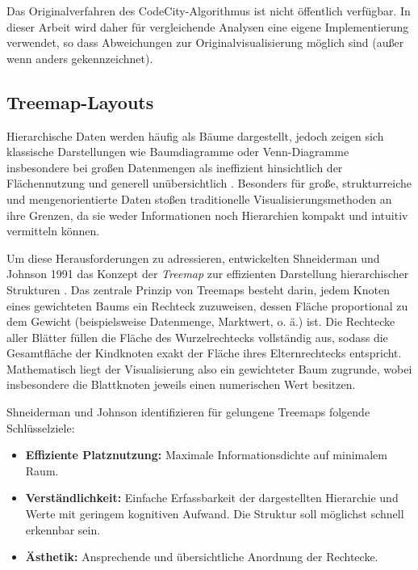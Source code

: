 Das Originalverfahren des CodeCity-Algorithmus ist nicht öffentlich verfügbar. In dieser Arbeit wird daher für vergleichende Analysen eine eigene Implementierung verwendet, so dass Abweichungen zur Originalvisualisierung möglich sind (außer wenn anders gekennzeichnet).

\subsection{Treemap-Layouts} \label{sec:Treemap}

Hierarchische Daten werden häufig als Bäume dargestellt, jedoch zeigen sich klassische Darstellungen wie Baumdiagramme oder Venn-Diagramme insbesondere bei großen Datenmengen als ineffizient hinsichtlich der Flächennutzung und generell unübersichtlich \cite{johnson1991tree}. Besonders für große, strukturreiche und mengenorientierte Daten stoßen traditionelle Visualisierungsmethoden an ihre Grenzen, da sie weder Informationen noch Hierarchien kompakt und intuitiv vermitteln können.

Um diese Herausforderungen zu adressieren, entwickelten Shneiderman und Johnson 1991 das Konzept der \textit{Treemap} zur effizienten Darstellung hierarchischer Strukturen \cite{johnson1991tree}.
Das zentrale Prinzip von Treemaps besteht darin, jedem Knoten eines gewichteten Baums ein Rechteck zuzuweisen, dessen Fläche proportional zu dem Gewicht (beispielsweise Datenmenge, Marktwert, o. ä.) ist.
Die Rechtecke aller Blätter füllen die Fläche des Wurzelrechtecks vollständig aus, sodass die Gesamtfläche der Kindknoten exakt der Fläche ihres Elternrechtecks entspricht. Mathematisch liegt der Visualisierung also ein gewichteter Baum zugrunde, wobei insbesondere die Blattknoten jeweils einen numerischen Wert besitzen.

Shneiderman und Johnson identifizieren für gelungene Treemaps folgende Schlüsselziele:
\begin{itemize}
    \item \textbf{Effiziente Platznutzung:} Maximale Informationsdichte auf minimalem Raum.
    \item \textbf{Verständlichkeit:} Einfache Erfassbarkeit der dargestellten Hierarchie und Werte mit geringem kognitiven Aufwand. Die Struktur soll möglichst schnell erkennbar sein.
    \item \textbf{Ästhetik:} Ansprechende und übersichtliche Anordnung der Rechtecke.
\end{itemize}

